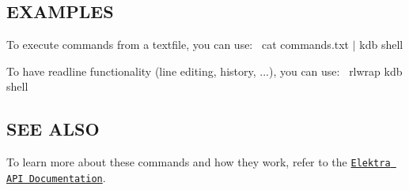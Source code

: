 \subsection*{E\+X\+A\+M\+P\+L\+ES}

To execute commands from a textfile, you can use\+:~\newline
 {\ttfamily cat commands.\+txt $\vert$ kdb shell}

To have readline functionality (line editing, history, ...), you can use\+:~\newline
 {\ttfamily rlwrap kdb shell}

\subsection*{S\+EE A\+L\+SO}

To learn more about these commands and how they work, refer to the \href{https://doc.libelektra.org/api/current/html}{\tt Elektra A\+PI Documentation}. 